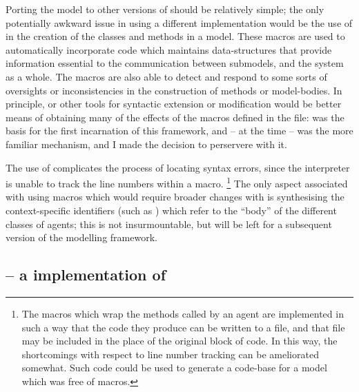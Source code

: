 Porting the model to other versions of \Scheme should be relatively
simple; the only potentially awkward issue in using a
different \Scheme implementation would be the use of \sdefmac in the
creation of the classes and methods in a model.  These macros are used
to automatically incorporate code which maintains data-structures that
provide information essential to the communication between submodels,
and the system as a whole. The macros are also able to detect and
respond to some sorts of oversights or inconsistencies in the
construction of methods or model-bodies.  In principle, \sdefsyntax or
other tools for syntactic extension or modification would be better
means of obtaining many of the effects of the macros defined in the
 file: \sdefmac was the basis for the first
incarnation of this framework, and -- at the time -- was the more
familiar mechanism, and I made the decision to perservere with it.

The use of \sdefmac complicates the process of locating syntax errors,
since the interpreter is unable to track the line numbers within a
macro. \footnote{The macros which wrap the methods called by an agent
are implemented in such a way that the code they produce can be
written to a file, and that file may be included in the place of the
original block of code.  In this way, the shortcomings with respect to
line number tracking can be ameliorated somewhat.  Such code could be
used to generate a code-base for a model which was free of macros.}
The only aspect associated with using macros which would require
broader changes with \sdefsyntax is synthesising the context-specific
identifiers (such as
) which refer to the ``body'' of the
different classes of agents; this is not insurmountable, but will be
left for a subsequent version of the modelling framework.

\subsection{\SCLOS -- a \Scheme implementation of \CLOS}

